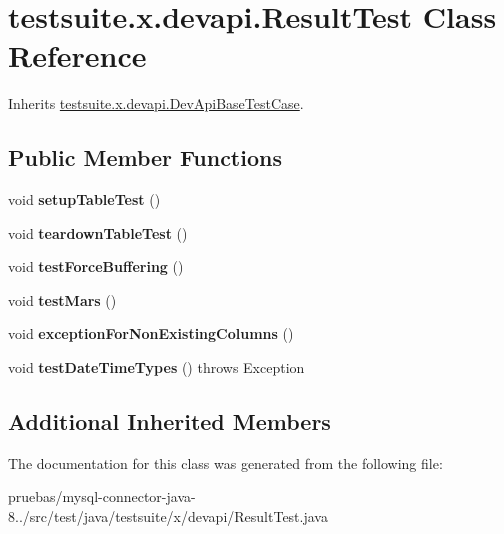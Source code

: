 \hypertarget{classtestsuite_1_1x_1_1devapi_1_1_result_test}{}\section{testsuite.\+x.\+devapi.\+Result\+Test Class Reference}
\label{classtestsuite_1_1x_1_1devapi_1_1_result_test}


Inherits \mbox{\hyperlink{classtestsuite_1_1x_1_1devapi_1_1_dev_api_base_test_case}{testsuite.\+x.\+devapi.\+Dev\+Api\+Base\+Test\+Case}}.

\subsection*{Public Member Functions}
\begin{DoxyCompactItemize}
\item 
\mbox{\label{classtestsuite_1_1x_1_1devapi_1_1_result_test_afe3f4dd56b293428cb47e9c44db06bac}} 
void {\bfseries setup\+Table\+Test} ()
\item 
\mbox{\label{classtestsuite_1_1x_1_1devapi_1_1_result_test_a3d15746ebf4a80d1d24d2373fcc3c632}} 
void {\bfseries teardown\+Table\+Test} ()
\item 
\mbox{\label{classtestsuite_1_1x_1_1devapi_1_1_result_test_a822d5c48fd1c91dfd6fde563f689bb76}} 
void {\bfseries test\+Force\+Buffering} ()
\item 
\mbox{\label{classtestsuite_1_1x_1_1devapi_1_1_result_test_aac6e53867d5be2e23aa6f43200bff7bf}} 
void {\bfseries test\+Mars} ()
\item 
\mbox{\label{classtestsuite_1_1x_1_1devapi_1_1_result_test_a07416f1de28c45339479de6f4b7257c6}} 
void {\bfseries exception\+For\+Non\+Existing\+Columns} ()
\item 
\mbox{\label{classtestsuite_1_1x_1_1devapi_1_1_result_test_a0575a8858d0fb560268c12a3e0de8c36}} 
void {\bfseries test\+Date\+Time\+Types} ()  throws Exception 
\end{DoxyCompactItemize}
\subsection*{Additional Inherited Members}


The documentation for this class was generated from the following file\+:\begin{DoxyCompactItemize}
\item 
pruebas/mysql-\/connector-\/java-\/8../src/test/java/testsuite/x/devapi/Result\+Test.\+java\end{DoxyCompactItemize}
